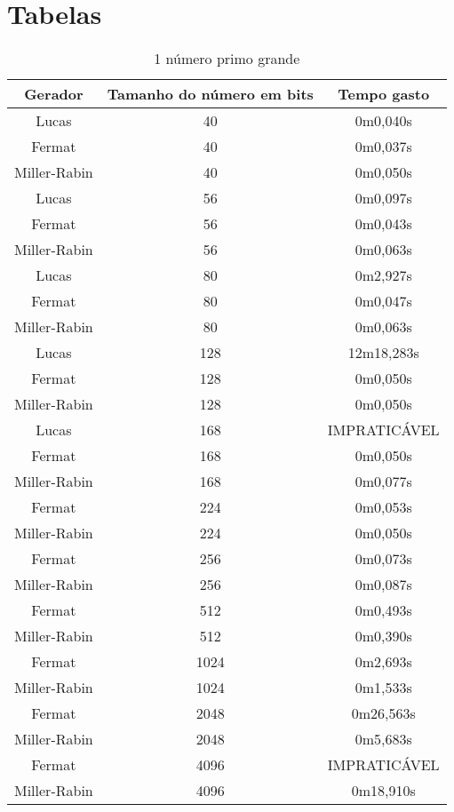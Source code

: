 \documentclass[12pt]{article}
\begin{document}
\section{Tabelas}
\begin{table}[h]
  \centering
  \caption{1 número primo grande}
  \label{table:tests}
  \begin{tabular}{|c|c|c|}
  \hline
  Gerador & Tamanho do número em bits & Tempo gasto  \\ \hline
  Lucas     & 40 & 0m0,040s \\ \hline
  Fermat     & 40 & 0m0,037s  \\ \hline
  Miller-Rabin     & 40 & 0m0,050s  \\ \hline
  Lucas     & 56 & 0m0,097s \\ \hline
  Fermat     & 56 & 0m0,043s  \\ \hline
  Miller-Rabin     & 56 & 0m0,063s  \\ \hline
  Lucas     & 80 & 0m2,927s \\ \hline
  Fermat     & 80 & 0m0,047s  \\ \hline
  Miller-Rabin     & 80 & 0m0,063s  \\ \hline
  Lucas     & 128 & 12m18,283s \\ \hline
  Fermat     & 128 & 0m0,050s  \\ \hline
  Miller-Rabin     & 128 & 0m0,050s  \\ \hline
  Lucas     & 168 & IMPRATICÁVEL \\ \hline
  Fermat     & 168 & 0m0,050s  \\ \hline
  Miller-Rabin     & 168 & 0m0,077s  \\ \hline
  Fermat     & 224 & 0m0,053s  \\ \hline
  Miller-Rabin     & 224 & 0m0,050s  \\ \hline
  Fermat     & 256 & 0m0,073s  \\ \hline
  Miller-Rabin     & 256 & 0m0,087s  \\ \hline
  Fermat     & 512 & 0m0,493s  \\ \hline
  Miller-Rabin     & 512 & 0m0,390s  \\ \hline
  Fermat     & 1024 & 0m2,693s  \\ \hline
  Miller-Rabin     & 1024 & 0m1,533s \\ \hline
  Fermat     & 2048 & 0m26,563s  \\ \hline
  Miller-Rabin     & 2048 & 0m5,683s \\ \hline
  Fermat     & 4096 & IMPRATICÁVEL  \\ \hline
  Miller-Rabin     & 4096 & 0m18,910s \\ \hline
  \end{tabular}
\end{table}
\end{document}
